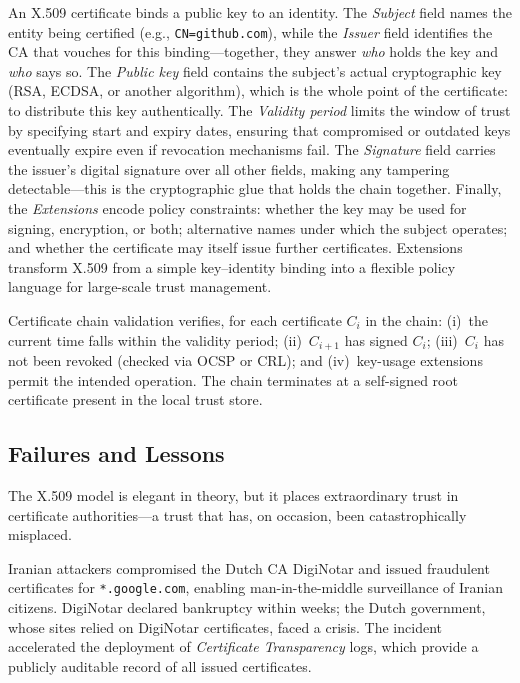 \begin{definition}[X.509 Certificate]
\label{def:x509}
An X.509 certificate binds a public key to an identity.  The \emph{Subject} field names the entity being certified (e.g., \texttt{CN=github.com}), while the \emph{Issuer} field identifies the CA that vouches for this binding---together, they answer \emph{who} holds the key and \emph{who} says so.  The \emph{Public key} field contains the subject's actual cryptographic key (RSA, ECDSA, or another algorithm), which is the whole point of the certificate: to distribute this key authentically.  The \emph{Validity period} limits the window of trust by specifying start and expiry dates, ensuring that compromised or outdated keys eventually expire even if revocation mechanisms fail.  The \emph{Signature} field carries the issuer's digital signature over all other fields, making any tampering detectable---this is the cryptographic glue that holds the chain together.  Finally, the \emph{Extensions} encode policy constraints: whether the key may be used for signing, encryption, or both; alternative names under which the subject operates; and whether the certificate may itself issue further certificates.  Extensions transform X.509 from a simple key--identity binding into a flexible policy language for large-scale trust management.
\end{definition}

Certificate chain validation verifies, for each certificate $C_i$ in the chain: (i)~the current time falls within the validity period; (ii)~$C_{i+1}$ has signed $C_i$; (iii)~$C_i$ has not been revoked (checked via OCSP or CRL); and (iv)~key-usage extensions permit the intended operation.  The chain terminates at a self-signed root certificate present in the local trust store.

\subsection{Failures and Lessons}
\label{subsec:pki-failures}

The X.509 model is elegant in theory, but it places extraordinary trust in certificate authorities---a trust that has, on occasion, been catastrophically misplaced.

\begin{example}
\label{ex:diginotar}
Iranian attackers compromised the Dutch CA DigiNotar and issued fraudulent certificates for \texttt{*.google.com}, enabling man-in-the-middle surveillance of Iranian citizens.  DigiNotar declared bankruptcy within weeks; the Dutch government, whose sites relied on DigiNotar certificates, faced a crisis.  The incident accelerated the deployment of \emph{Certificate Transparency} logs, which provide a publicly auditable record of all issued certificates.
\end{example}

